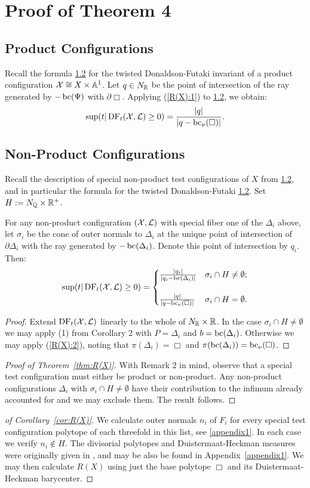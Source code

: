 \section{Proof of Theorem 4}
\subsection{Product Configurations}
Recall the formula \ref{} for the twisted Donaldson-Futaki invariant of a product configuration \({\mathcal{X}} \cong X \times \mathbb{A}^1\).
Let \(q \in N_{\mathbb{R}}\) be the point of intersection of the ray generated by \(-\mathop{\rm bc}\nolimits(\Psi)\) with \(\partial \Box\). Applying (\ref{R(X):1}) to \ref{}, we obtain:
\[
\sup(t | \mathop{\rm DF}\nolimits_t({\mathcal{X}},\mathcal{L}) \ge 0) = \frac{|q|}{|q-\mathop{\rm bc}\nolimits_\nu(\Box)|}.
\]
\subsection{Non-Product Configurations}
Recall the description of special non-product test configurations of \(X\) from \ref{}, and in particular the formula for the twisted Donaldson-Futaki \ref{}. Set \(H := N_{\mathbb{Q}} \times \mathbb{R}^+\).
\begin{proposition}
For any non-product configuration \(({\mathcal{X}},\mathcal{L})\) with special fiber one of the \(\Delta_i\) above, let \(\sigma_i\) be the cone of outer normals to \(\Delta_i\) at the unique point of intersection of \(\partial \Delta_i\) with the ray generated by \(-\mathop{\rm bc}\nolimits(\Delta_i)\). Denote this point of intersection by \(q_i\). Then:
\[
\sup(t | \mathop{\rm DF}\nolimits_t({\mathcal{X}},\mathcal{L}) \ge 0) =\begin{cases} 
     \frac{|q_i|}{|q_i - \mathop{\rm bc}\nolimits(\Delta_i)|} & \sigma_i \cap H \neq \emptyset ;\\ \\
      \frac{|q|}{|q-\mathop{\rm bc}\nolimits_\nu(\Box)|} & \sigma_i \cap H = \emptyset.
   \end{cases}
\]
\end{proposition}
\begin{proof}
Extend \(\mathop{\rm DF}\nolimits_t({\mathcal{X}},\mathcal{L})\) linearly to the whole of \(N_{\mathbb{R}} \times \mathbb{R}\). In the case \(\sigma_i \cap H \neq \emptyset\) we may apply (1) from Corollary 2 with \(P = \Delta_i\) and \(b = \mathop{\rm bc}\nolimits(\Delta_i)\). Otherwise we may apply (\ref{R(X):2}), noting that \(\pi(\Delta_i) = \Box\) and \(\pi(\mathop{\rm bc}\nolimits(\Delta_i)) = \mathop{\rm bc}\nolimits_\nu( \Box)\).
\end{proof}
\begin{proof}[Proof of Theorem~\ref{thm:R(X)}]
With Remark 2 in mind, observe that a special test configuration must either be product or non-product. Any non-product configurations \(\Delta_i\) with \(\sigma_i \cap H \neq \emptyset\) have their contribution to the infimum already accounted for and we may exclude them. The result follows.
\end{proof}
\begin{proof}[of Corollary~\ref{cor:R(X)}]
We calculate outer normals \(n_i \) of \(F_i\) for every special test configuration polytope of each threefold in this list, see \ref{appendix1}. In each case we verify \(n_i \notin H\). The divisorial polytopes and Duistermaat-Heckman measures were originally given in \cite{suss2013fano}, and may be also be found in Appendix~\ref{appendix1}. We may then calculate \(R(X)\) using just the base polytope \(\Box\) and its Duistermaat-Heckman barycenter.
\end{proof}